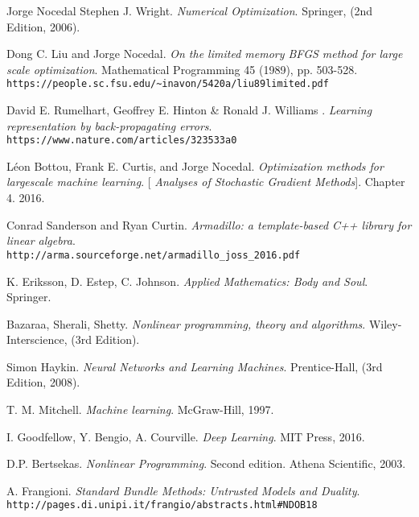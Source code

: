 \begin{thebibliography}{9}

	Jorge Nocedal  Stephen J. Wright.
	\textit{Numerical Optimization}. Springer, (2nd Edition, 2006).

	Dong C. Liu and Jorge Nocedal.
	\textit{On the limited memory BFGS method for large scale optimization}. Mathematical Programming 45 (1989), pp. 503-528.
	\\\texttt{https://people.sc.fsu.edu/\textasciitilde inavon/5420a/liu89limited.pdf}
	
	David E. Rumelhart, Geoffrey E. Hinton \& Ronald J. Williams . 
	\textit{Learning representation by back-propagating errors}. 
	\\\texttt{https://www.nature.com/articles/323533a0}
	
		
	Léon Bottou, Frank E. Curtis, and Jorge Nocedal.
	\textit{Optimization methods for largescale machine learning}. 
	[\textit{ Analyses of Stochastic Gradient Methods}]. Chapter 4.
	2016.
	
	Conrad Sanderson and Ryan Curtin. 
	\textit{Armadillo: a template-based C++ library for linear algebra}. 
	\\\texttt{http://arma.sourceforge.net/armadillo\_joss\_2016.pdf}

	K. Eriksson, D. Estep, C. Johnson. 
	\textit{Applied Mathematics: Body and Soul}. 
	Springer.
	
	Bazaraa, Sherali, Shetty. 
	\textit{Nonlinear programming, theory and algorithms}. 
	Wiley-Interscience, (3rd Edition).
	
	Simon Haykin. 
	\textit{Neural Networks and Learning Machines}. 
	Prentice-Hall, (3rd Edition, 2008).


	T. M. Mitchell. 
	\textit{Machine learning}. 
	McGraw-Hill, 1997.
	
	I. Goodfellow, Y. Bengio, A. Courville. 
	\textit{Deep Learning}. 
	MIT Press,  2016.
	
	D.P. Bertsekas.
	\textit{Nonlinear Programming}. 
	Second edition. Athena Scientific, 2003.
	
	A. Frangioni.
	\textit{Standard Bundle Methods: Untrusted Models and Duality}.
	\\\texttt{http://pages.di.unipi.it/frangio/abstracts.html\#NDOB18}
	

\end{thebibliography}
